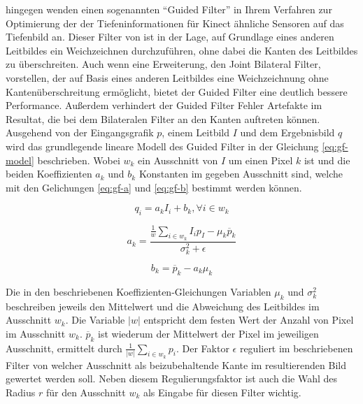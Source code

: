 \citet{liu2012guided} hingegen wenden einen sogenannten \enquote{Guided Filter} in Ihrem Verfahren zur Optimierung der der Tiefeninformationen für Kinect ähnliche Sensoren auf das Tiefenbild an. Dieser Filter von \citet{he2010guided} ist in der Lage, auf Grundlage eines anderen Leitbildes ein Weichzeichnen durchzuführen, ohne dabei die Kanten des Leitbildes zu überschreiten. Auch wenn \citet{petschnigg2004digital} eine Erweiterung, den Joint Bilateral Filter, vorstellen, der auf Basis eines anderen Leitbildes eine Weichzeichnung ohne Kantenüberschreitung ermöglicht, bietet der Guided Filter eine deutlich bessere Performance. Außerdem verhindert der Guided Filter Fehler Artefakte im Resultat, die bei dem Bilateralen Filter an den Kanten auftreten können. \citep{he2010guided} \\


Ausgehend von der Eingangsgrafik \(p\), einem Leitbild \(I\) und dem Ergebnisbild \(q\) wird das grundlegende lineare Modell des Guided Filter in der Gleichung \ref{eq:gf-model} beschrieben. Wobei \(w_k\) ein Ausschnitt von \(I\) um einen Pixel \(k\) ist und die beiden Koeffizienten \(a_k\) und \(b_k\) Konstanten im gegeben Ausschnitt sind, welche mit den Gelichungen \ref{eq:gf-a} und \ref{eq:gf-b} bestimmt werden können. \citep{he2010guided}


\begin{equation} \label{eq:gf-model}
q_{i} = a_{k} I_{i} + b_{k} , \forall i \in w_{k}
\end{equation}

\begin{equation} \label{eq:gf-a}
a_k = \frac{\frac{1}{w} \sum_{i \in w_k} I_i p_I - \mu_k \overline{p}_k}{\sigma_k^2+\epsilon}
\end{equation}

\begin{equation} \label{eq:gf-b}
b_k = \overline{p}_k - a_k\mu_k
\end{equation}

Die in den beschriebenen Koeffizienten-Gleichungen Variablen \(\mu_k\) und \(\sigma^2_k\) beschreiben jeweils den Mittelwert und die Abweichung des Leitbildes im Ausschnitt \(w_k\). Die Variable \(|w|\) entspricht dem festen Wert der Anzahl von Pixel im Ausschnitt \(w_k\). \(\overline{p}_k\) ist wiederum der Mittelwert der Pixel im jeweiligen Ausschnitt, ermittelt durch \(\frac{1}{|w|} \sum_{i \in w_k} p_i\). Der Faktor \(\epsilon\) reguliert im beschriebenen Filter von \citet{he2010guided} welcher Ausschnitt als beizubehaltende Kante im resultierenden Bild gewertet werden soll. Neben diesem Regulierungsfaktor ist auch die Wahl des Radius \(r\) für den Ausschnitt \(w_k\) als Eingabe für diesen Filter wichtig. \citep{he2010guided} \\

